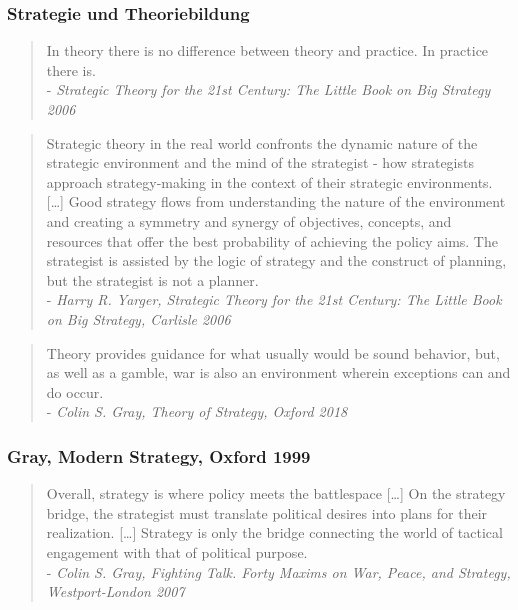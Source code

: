 {}\documentclass[a4paper]{article}
\begin{document}
\subsubsection{Strategie und
	Theoriebildung}\label{strategie-und-theoriebildung}

\begin{quote}
	In theory there is no difference between theory and practice. In
	practice there is.\\
	- \emph{Strategic Theory for the 21st Century: The Little Book on Big
		Strategy 2006}
\end{quote}

\begin{quote}
	Strategic theory in the real world confronts the dynamic nature of the
	strategic environment and the mind of the strategist - how strategists
	approach strategy-making in the context of their strategic environments.
	{[}\ldots{]} Good strategy flows from understanding the nature of the
	environment and creating a symmetry and synergy of objectives, concepts,
	and resources that offer the best probability of achieving the policy
	aims. The strategist is assisted by the logic of strategy and the
	construct of planning, but the strategist is not a planner.\\
	- \emph{Harry R. Yarger, Strategic Theory for the 21st Century: The
		Little Book on Big Strategy, Carlisle 2006}
\end{quote}

\begin{quote}
	Theory provides guidance for what usually would be sound behavior, but,
	as well as a gamble, war is also an environment wherein exceptions can
	and do occur.\\
	- \emph{Colin S. Gray, Theory of Strategy, Oxford 2018}
\end{quote}

\subsubsection{Gray, Modern Strategy, Oxford
	1999}\label{gray-modern-strategy-oxford-1999}

\begin{quote}
	Overall, strategy is where policy meets the battlespace {[}\ldots{]} On
	the strategy bridge, the strategist must translate political desires
	into plans for their realization. {[}\ldots{]} Strategy is only the
	bridge connecting the world of tactical engagement with that of
	political purpose.\\
	- \emph{Colin S. Gray, Fighting Talk. Forty Maxims on War, Peace, and
		Strategy, Westport-London 2007}
\end{quote}
\end{document}
